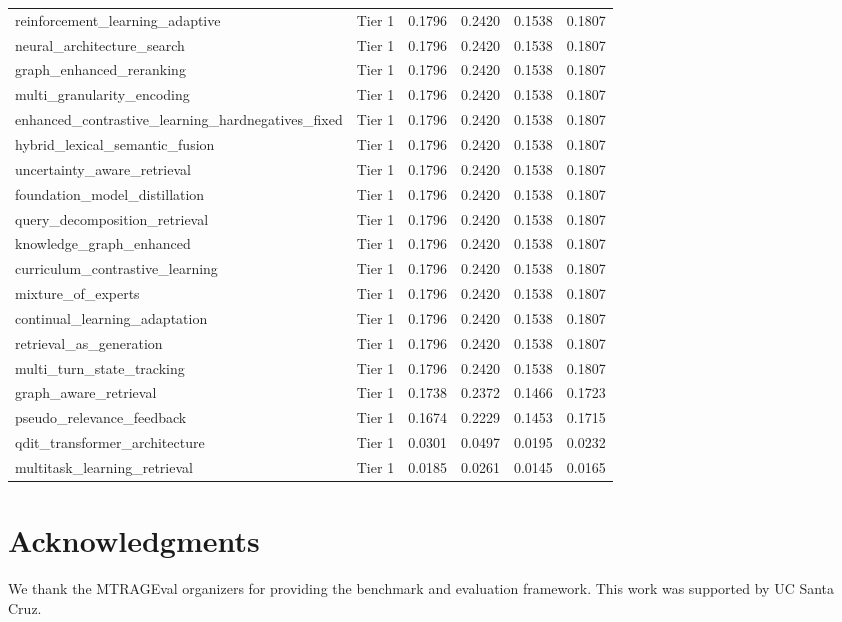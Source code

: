 \documentclass[11pt]{article}
\begin{document}
\begin{longtable}{lccccc}
reinforcement\_learning\_adaptive & Tier 1 & 0.1796 & 0.2420 & 0.1538 & 0.1807 \\
neural\_architecture\_search & Tier 1 & 0.1796 & 0.2420 & 0.1538 & 0.1807 \\
graph\_enhanced\_reranking & Tier 1 & 0.1796 & 0.2420 & 0.1538 & 0.1807 \\
multi\_granularity\_encoding & Tier 1 & 0.1796 & 0.2420 & 0.1538 & 0.1807 \\
enhanced\_contrastive\_learning\_hardnegatives\_fixed & Tier 1 & 0.1796 & 0.2420 & 0.1538 & 0.1807 \\
hybrid\_lexical\_semantic\_fusion & Tier 1 & 0.1796 & 0.2420 & 0.1538 & 0.1807 \\
uncertainty\_aware\_retrieval & Tier 1 & 0.1796 & 0.2420 & 0.1538 & 0.1807 \\
foundation\_model\_distillation & Tier 1 & 0.1796 & 0.2420 & 0.1538 & 0.1807 \\
query\_decomposition\_retrieval & Tier 1 & 0.1796 & 0.2420 & 0.1538 & 0.1807 \\
knowledge\_graph\_enhanced & Tier 1 & 0.1796 & 0.2420 & 0.1538 & 0.1807 \\
curriculum\_contrastive\_learning & Tier 1 & 0.1796 & 0.2420 & 0.1538 & 0.1807 \\
mixture\_of\_experts & Tier 1 & 0.1796 & 0.2420 & 0.1538 & 0.1807 \\
continual\_learning\_adaptation & Tier 1 & 0.1796 & 0.2420 & 0.1538 & 0.1807 \\
retrieval\_as\_generation & Tier 1 & 0.1796 & 0.2420 & 0.1538 & 0.1807 \\
multi\_turn\_state\_tracking & Tier 1 & 0.1796 & 0.2420 & 0.1538 & 0.1807 \\
graph\_aware\_retrieval & Tier 1 & 0.1738 & 0.2372 & 0.1466 & 0.1723 \\
pseudo\_relevance\_feedback & Tier 1 & 0.1674 & 0.2229 & 0.1453 & 0.1715 \\
qdit\_transformer\_architecture & Tier 1 & 0.0301 & 0.0497 & 0.0195 & 0.0232 \\
multitask\_learning\_retrieval & Tier 1 & 0.0185 & 0.0261 & 0.0145 & 0.0165 \\
\end{longtable}

\section*{Acknowledgments}

We thank the MTRAGEval organizers for providing the benchmark and evaluation framework. This work was supported by UC Santa Cruz.
\end{document}
